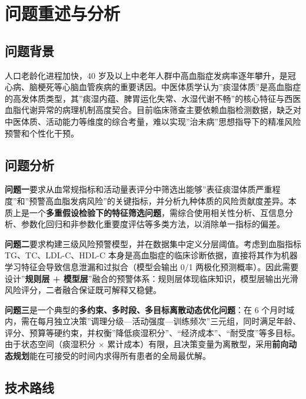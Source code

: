 \documentclass{MathorCupmodeling}
\begin{document}
\tableofcontents
\newpage

\section{问题重述与分析}\label{ux4e00ux95eeux9898ux91cdux8ff0ux4e0eux5206ux6790}

\subsection{问题背景}\label{ux95eeux9898ux80ccux666f}

人口老龄化进程加快，40 岁及以上中老年人群中高血脂症发病率逐年攀升，是冠心病、脑梗死等心脑血管疾病的重要诱因。中医体质学认为''痰湿体质''是高血脂症的高发体质类型，其''痰湿内蕴、脾胃运化失常、水湿代谢不畅''的核心特征与西医血脂代谢异常的病理机制高度契合。目前临床筛查主要依赖血脂检测数据，缺乏对中医体质、活动能力等维度的综合考量，难以实现''治未病''思想指导下的精准风险预警和个性化干预。

\subsection{问题分析}\label{ux95eeux9898ux5206ux6790}

\textbf{问题一}要求从血常规指标和活动量表评分中筛选出能够''表征痰湿体质严重程度''和''预警高血脂发病风险''的关键指标，并分析九种体质的风险贡献度差异。本质上是一个\textbf{多重假设检验下的特征筛选问题}，需综合使用相关性分析、互信息分析、参数化回归和非参数化重要度评估等多类方法，以消除单一指标的偏差。

\textbf{问题二}要求构建三级风险预警模型，并在数据集中定义分层阈值。考虑到血脂指标 TG、TC、LDL-C、HDL-C 本身是高血脂症的临床诊断依据，直接将其作为机器学习特征会导致信息泄漏和过拟合（模型会输出 0/1 两极化预测概率）。因此需要设计''\textbf{规则层 + 模型层}''融合的预警体系：规则层体现临床知识，模型层输出光滑风险评分，二者融合保证既可解释又稳健。

\textbf{问题三}是一个典型的\textbf{多约束、多时段、多目标离散动态优化问题}：在 6 个月时域内，需在每月独立决策''调理分级---活动强度---训练频次''三元组，同时满足年龄、评分、预算等硬约束，并权衡''降低痰湿积分''、``经济成本''、``耐受度''等多目标。由于状态空间（痰湿积分 × 累计成本）有限，且决策变量为离散型，采用\textbf{前向动态规划}能在可接受的时间内求得所有患者的全局最优解。

\subsection{技术路线}\label{ux6280ux672fux8defux7ebf}
\end{document}
